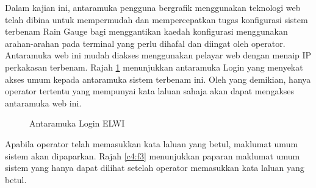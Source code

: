Dalam kajian ini, antaramuka pengguna bergrafik menggunakan teknologi web telah dibina untuk mempermudah dan mempercepatkan tugas konfigurasi sistem terbenam Rain Gauge bagi menggantikan kaedah konfigurasi menggunakan arahan-arahan pada terminal yang perlu dihafal dan diingat oleh operator. Antaramuka web ini mudah diakses menggunakan pelayar web dengan menaip IP perkakasan terbenam. Rajah \ref{c4:f2} menunjukkan antaramuka Login yang menyekat akses umum kepada antaramuka sistem terbenam ini. Oleh yang demikian, hanya operator tertentu yang mempunyai kata laluan sahaja akan dapat mengakses antaramuka web ini.
 
\begin{figure}[!h]
\caption[Antaramuka Login ELWI]{Antaramuka Login ELWI}
\label{c4:f2}
\end{figure}

Apabila operator telah memasukkan kata laluan yang betul, maklumat umum sistem akan dipaparkan. Rajah \ref{c4:f3} menunjukkan paparan maklumat umum sistem yang hanya dapat dilihat setelah operator memasukkan kata laluan yang betul.

